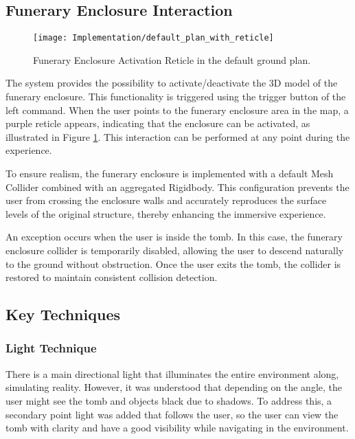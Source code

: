 \subsection*{Funerary Enclosure Interaction}
 \begin{figure}[h!]
    \centering
    \texttt{[image: Implementation/default\_plan\_with\_reticle]}
    \caption{Funerary Enclosure Activation Reticle in the default ground plan.}
    \label{fig:funerary_interaction}    
\end{figure}

The system provides the possibility to activate/deactivate the \gls{3D} model of the funerary enclosure.
This functionality is triggered using the trigger button of the left command. When the user points to the funerary enclosure area in the map, a purple reticle appears, indicating that the enclosure can be activated, as illustrated in Figure \ref{fig:funerary_interaction}. This interaction can be performed at any point during the experience.

To ensure realism, the funerary enclosure is implemented with a default Mesh Collider combined with an aggregated Rigidbody. This configuration prevents the user from crossing the enclosure walls and accurately reproduces the surface levels of the original structure, thereby enhancing the immersive experience.

An exception occurs when the user is inside the tomb. In this case, the funerary enclosure collider is temporarily disabled, allowing the user to descend naturally to the ground without obstruction. Once the user exits the tomb, the collider is restored to maintain consistent collision detection.

\subsection{Key Techniques}
\subsubsection{Light Technique}
There is a main directional light that illuminates the entire environment along, simulating reality. However, it was understood that depending on the angle, the user might see the tomb and objects black due to shadows. To address this, a secondary point light was added that follows the user, so the user can view the tomb with clarity and have a good visibility while navigating in the environment.

